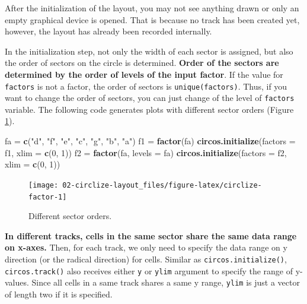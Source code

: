 \documentclass[]{book}
\newenvironment{Shaded}{\begin{snugshade}}{\end{snugshade}}
\newcommand{\KeywordTok}[1]{\textcolor[rgb]{0.13,0.29,0.53}{\textbf{#1}}}
\newcommand{\DataTypeTok}[1]{\textcolor[rgb]{0.13,0.29,0.53}{#1}}
\newcommand{\DecValTok}[1]{\textcolor[rgb]{0.00,0.00,0.81}{#1}}
\newcommand{\StringTok}[1]{\textcolor[rgb]{0.31,0.60,0.02}{#1}}
\newcommand{\NormalTok}[1]{#1}
\begin{document}
After the initialization of the layout, you may not see anything drawn
or only an empty graphical device is opened. That is because no track
has been created yet, however, the layout has already been recorded
internally.

In the initialization step, not only the width of each sector is
assigned, but also the order of sectors on the circle is determined.
\textbf{Order of the sectors are determined by the order of levels of
the input factor}. If the value for \texttt{factors} is not a factor,
the order of sectors is \texttt{unique(factors)}. Thus, if you want to
change the order of sectors, you can just change of the level of
\texttt{factors} variable. The following code generates plots with
different sector orders (Figure \ref{fig:circlize-factor}).

\begin{Shaded}
\begin{Highlighting}[]
\NormalTok{fa =}\StringTok{ }\KeywordTok{c}\NormalTok{(}\StringTok{"d"}\NormalTok{, }\StringTok{"f"}\NormalTok{, }\StringTok{"e"}\NormalTok{, }\StringTok{"c"}\NormalTok{, }\StringTok{"g"}\NormalTok{, }\StringTok{"b"}\NormalTok{, }\StringTok{"a"}\NormalTok{)}
\NormalTok{f1 =}\StringTok{ }\KeywordTok{factor}\NormalTok{(fa)}
\KeywordTok{circos.initialize}\NormalTok{(}\DataTypeTok{factors =}\NormalTok{ f1, }\DataTypeTok{xlim =} \KeywordTok{c}\NormalTok{(}\DecValTok{0}\NormalTok{, }\DecValTok{1}\NormalTok{))}
\NormalTok{f2 =}\StringTok{ }\KeywordTok{factor}\NormalTok{(fa, }\DataTypeTok{levels =}\NormalTok{ fa)}
\KeywordTok{circos.initialize}\NormalTok{(}\DataTypeTok{factors =}\NormalTok{ f2, }\DataTypeTok{xlim =} \KeywordTok{c}\NormalTok{(}\DecValTok{0}\NormalTok{, }\DecValTok{1}\NormalTok{))}
\end{Highlighting}
\end{Shaded}

\begin{figure}

{\centering \texttt{[image: 02-circlize-layout\_files/figure-latex/circlize-factor-1]} 

}

\caption{Different sector orders.}\label{fig:circlize-factor}
\end{figure}

\textbf{In different tracks, cells in the same sector share the same
data range on x-axes.} Then, for each track, we only need to specify the
data range on y direction (or the radical direction) for cells. Similar
as \texttt{circos.initialize()}, \texttt{circos.track()} also receives
either \texttt{y} or \texttt{ylim} argument to specify the range of
y-values. Since all cells in a same track shares a same y range,
\texttt{ylim} is just a vector of length two if it is specified.
\end{document}
